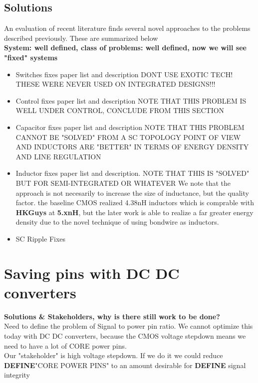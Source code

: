 \documentclass[letterpaper,twocolumn,10pt]{article}
\begin{document}
\subsection{Solutions}
An evaluation of recent literature finds several novel approaches to the problems described previously. These are summarized below\\


\textbf{System: well defined, class of problems: well defined, now we will see "fixed" systems}\\
\begin{itemize}
\item{Switches fixes paper list and description DONT USE EXOTIC TECH! THESE WERE NEVER USED ON INTEGRATED DESIGNS!!!}
\item{Control fixes paper list and description NOTE THAT THIS PROBLEM IS WELL UNDER CONTROL, CONCLUDE FROM THIS SECTION}
\item{Capacitor fixes paper list and description NOTE THAT THIS PROBLEM CANNOT BE "SOLVED" FROM A SC TOPOLOGY POINT OF VIEW AND INDUCTORS ARE "BETTER" IN TERMS OF ENERGY DENSITY AND LINE REGULATION}
\item{Inductor fixes paper list and description. NOTE THAT THIS IS "SOLVED" BUT FOR SEMI-INTEGRATED OR WHATEVER}
We note that the approach is not necesarily to increase the size of inductance, but the quality factor. the baseline CMOS \cite{Alimadadi2008} realized 4.38nH inductors which is comprable with \textbf{HKGuys} at \textbf{5.xnH}, but the later work is able to realize a far greater energy density due to the novel technique of using bondwire as inductors.
\item{SC Ripple Fixes} %
\end{itemize}

\section{Saving pins with DC DC converters}

\textbf{Solutions \& Stakeholders, why is there still work to be done?}\\
Need to define the problem of Signal to power pin ratio. We cannot optimize this today with DC DC converters, because the \@ CMOS voltage stepdown means we need to have a lot of CORE power pins.\\
Our "stakeholder" is high voltage stepdown. If we do it we could reduce \textbf{DEFINE}"CORE POWER PINS" to an amount desirable for \textbf{DEFINE} signal integrity\\
\end{document}
